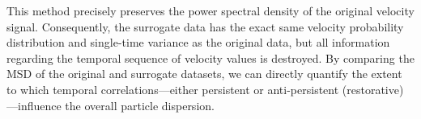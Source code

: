 \documentclass[]{article}
\begin{document}
This method precisely preserves the power spectral density of the original velocity signal. Consequently, the surrogate data has the exact same velocity probability distribution and single-time variance as the original data, but all information regarding the temporal sequence of velocity values is destroyed. By comparing the MSD of the original and surrogate datasets, we can directly quantify the extent to which temporal correlations—either persistent or anti-persistent (restorative)—influence the overall particle dispersion.
\end{document}
